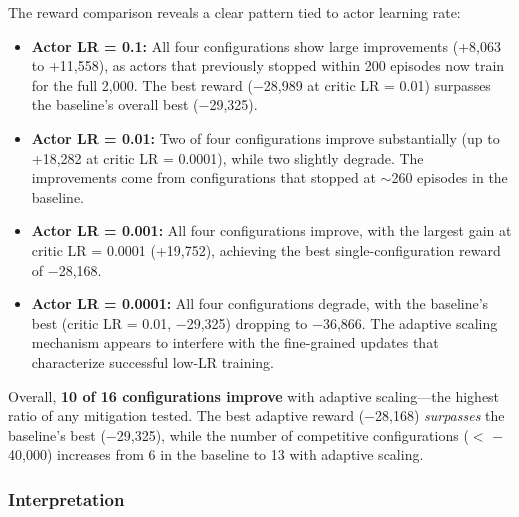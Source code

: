 The reward comparison reveals a clear pattern tied to actor learning rate:
\begin{itemize}
    \item \textbf{Actor LR = 0.1:} All four configurations show large improvements (+8,063 to +11,558), as actors that previously stopped within 200 episodes now train for the full 2,000. The best reward ($-$28,989 at critic LR = 0.01) surpasses the baseline's overall best ($-$29,325).

    \item \textbf{Actor LR = 0.01:} Two of four configurations improve substantially (up to +18,282 at critic LR = 0.0001), while two slightly degrade. The improvements come from configurations that stopped at $\sim$260 episodes in the baseline.

    \item \textbf{Actor LR = 0.001:} All four configurations improve, with the largest gain at critic LR = 0.0001 (+19,752), achieving the best single-configuration reward of $-$28,168.

    \item \textbf{Actor LR = 0.0001:} All four configurations degrade, with the baseline's best (critic LR = 0.01, $-$29,325) dropping to $-$36,866. The adaptive scaling mechanism appears to interfere with the fine-grained updates that characterize successful low-LR training.
\end{itemize}

Overall, \textbf{10 of 16 configurations improve} with adaptive scaling---the highest ratio of any mitigation tested. The best adaptive reward ($-$28,168) \textit{surpasses} the baseline's best ($-$29,325), while the number of competitive configurations ($<$ $-$40,000) increases from 6 in the baseline to 13 with adaptive scaling.

\subsubsection{Interpretation}

